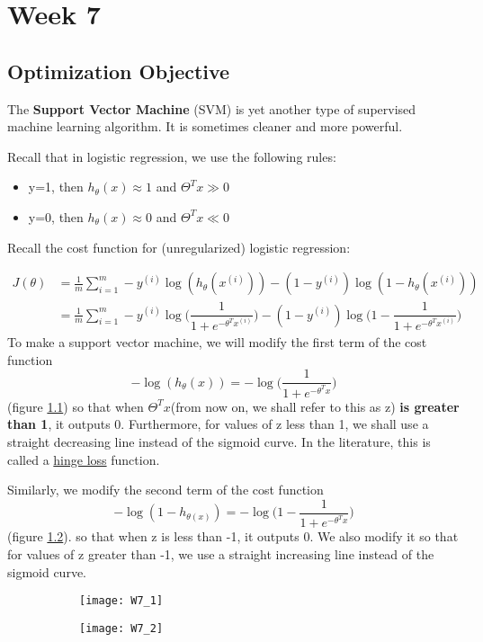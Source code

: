 \chapter{Week 7}
\section{Optimization Objective}
The \textbf{Support Vector Machine} (SVM) is yet another type of supervised machine learning algorithm. It is sometimes cleaner and more powerful.

Recall that in logistic regression, we use the following rules:

\begin{itemize}
\item y=1, then $h_\theta(x) \approx 1$ and $\Theta^Tx \gg 0$
\item y=0, then $h_\theta(x) \approx 0$ and $\Theta^Tx \ll 0$
\end{itemize}
Recall the cost function for (unregularized) logistic regression:
 
\begin{align*}
J(\theta) 
& = \frac{1}{m}\sum_{i=1}^m -y^{(i)} \log(h_\theta(x^{(i)})) - (1 - y^{(i)})\log(1 - h_\theta(x^{(i)}))\\ 
& = \frac{1}{m}\sum_{i=1}^m -y^{(i)} \log\Big(\dfrac{1}{1 + e^{-\theta^Tx^{(i)}}}\Big) - (1 - y^{(i)})\log\Big(1 - \dfrac{1}{1 + e^{-\theta^Tx^{(i)}}}\Big)
\end{align*}
To make a support vector machine, we will modify the first term of the cost function $$-\log(h_{\theta}(x)) = -\log\Big(\dfrac{1}{1 + e^{-\theta^Tx}}\Big)$$ (figure \ref{fig:W7_1}) so that when $\Theta^Tx$(from now on, we shall refer to this as z) \textbf{is greater than 1}, it outputs 0. Furthermore, for values of z less than 1, we shall use a straight decreasing line instead of the sigmoid curve. In the literature, this is called a \href{https://en.wikipedia.org/wiki/Hinge_loss}{hinge loss} function.

Similarly, we modify the second term of the cost function $$-\log(1 - h_{\theta(x)}) = -\log\Big(1 - \dfrac{1}{1 + e^{-\theta^Tx}}\Big)$$ (figure \ref{fig:W7_2}). so that when z is less than -1, it outputs 0. We also modify it so that for values of z greater than -1, we use a straight increasing line instead of the sigmoid curve.

\begin{figure}[ht]
     \centering
     \begin{subfigure}[b]{0.35\textwidth}
         \centering
         \texttt{[image: W7\_1]}
         \caption{}
         \label{fig:W7_1}
     \end{subfigure}
     \begin{subfigure}[b]{0.35\textwidth}
         \centering
         \texttt{[image: W7\_2]}
         \caption{}
         \label{fig:W7_2}
     \end{subfigure}
        \caption{}
        \label{fig:}
\end{figure}

